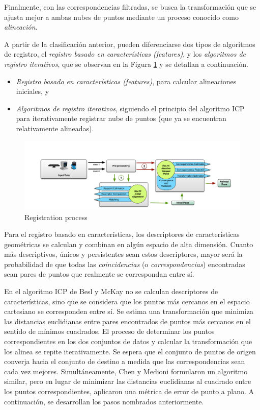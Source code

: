 Finalmente, con las correspondencias filtradas, se busca la transformación que se ajusta mejor a ambas nubes de puntos mediante un proceso conocido como \textit{alineación}.

\ifimagenes
\else
A partir de la clasificación anterior, pueden diferenciarse dos tipos de algoritmos de registro, el \textit{registro basado en características (features)}, y los \textit{algoritmos de registro iterativos}, que se observan en la Figura \ref{fig:registrationprocess} y se detallan a continuación.
\begin{itemize}
    \item \textit{Registro basado en características (features)}, para calcular alineaciones iniciales, y
    \item \textit{Algoritmos de registro iterativos}, siguiendo el principio del algoritmo ICP para iterativamente registrar nube de puntos (que ya se encuentran relativamente alineadas).
\end{itemize}

\begin{figure}[!ht]
    \centering
    \includegraphics[width=\linewidth]{Img/RegistrationProcess.png}
    \caption{Registration process}
    \label{fig:registrationprocess}
\end{figure}

Para el registro basado en características, los descriptores de características geométricas se calculan y combinan en algún espacio de alta dimensión. Cuanto más descriptivos, únicos y persistentes sean estos descriptores, mayor será la probabilidad de que todas las \textit{coincidencias} (o \textit{correspondencias}) encontradas sean pares de puntos que realmente se correspondan entre sí.

En el algoritmo ICP de Besl y McKay \cite{besl1992} no se calculan descriptores de características, sino que se considera que los puntos más cercanos en el espacio cartesiano se corresponden entre sí. Se estima una transformación que minimiza las distancias euclidianas entre pares encontrados de puntos más cercanos en el sentido de mínimos cuadrados. El proceso de determinar los puntos correspondientes en los dos conjuntos de datos y calcular la transformación que los alinea se repite iterativamente. Se espera que el conjunto de puntos de origen converja hacia el conjunto de destino a medida que las correspondencias sean cada vez mejores. Simultáneamente, Chen y Medioni \cite{chen1992} formularon un algoritmo similar, pero en lugar de minimizar las distancias euclidianas al cuadrado entre los puntos correspondientes, aplicaron una métrica de error de punto a plano.
\fi
A continuación, se desarrollan los pasos nombrados anteriormente.

